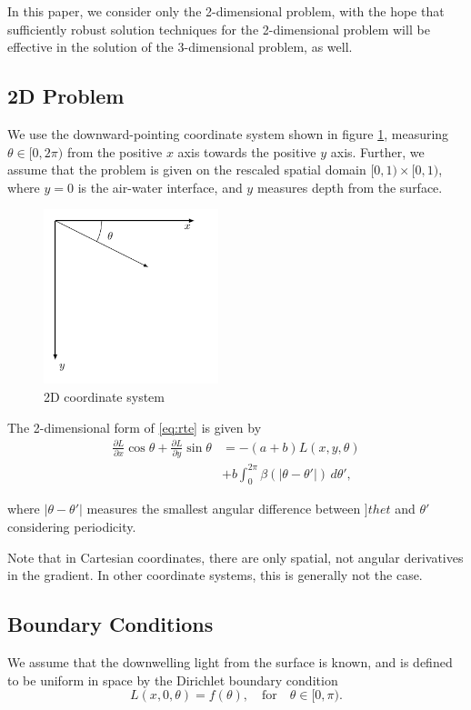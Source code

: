 \documentclass[10pt]{article}
\newcommand\abs[1]{\left| #1 \right|}
\newcommand\pd[2]{\frac{\partial #1}{\partial #2}}
\begin{document}
\begin{multicols}{2}
In this paper, we consider only the 2-dimensional problem, with the hope that sufficiently robust solution techniques for the 2-dimensional problem will be effective in the solution of the 3-dimensional problem, as well.

\subsection{2D Problem}
\label{sec:2d}
We use the downward-pointing coordinate system shown in figure \ref{fig:coords}, measuring $\theta \in [0,2\pi)$ from the positive $x$ axis towards the positive $y$ axis.
Further, we assume that the problem is given on the rescaled spatial domain $[0,1) \times [0,1)$, where $y=0$ is the air-water interface, and $y$ measures depth from the surface.

\begin{figure}[H]
	\centering
	\includegraphics[width=2in]{2d_coords}
	\caption{2D coordinate system}
	\label{fig:coords}
\end{figure}

The 2-dimensional form of \eqref{eq:rte} is given by
\begin{equation}
	\begin{aligned}
		\pd{L}{x} \cos\theta + \pd{L}{y} \sin\theta
		&= -(a+b)L(x,y,\theta) \\
		&+ b\int_0^{2\pi} \beta(\abs{\theta-\theta'})\,d\theta',
	\end{aligned}
	\label{eq:rte2d}
\end{equation}

where $\abs{\theta-\theta'}$ measures the smallest angular difference between $]thet$ and $\theta'$ considering periodicity.

Note that in Cartesian coordinates, there are only spatial, not angular derivatives in the gradient.
In other coordinate systems, this is generally not the case.
	
\subsection{Boundary Conditions}
We assume that the downwelling light from the surface is known, and is defined to be uniform in space by the Dirichlet boundary condition 
\begin{equation}
	L(x,0,\theta) = f(\theta), \quad \mbox{for} \quad \theta \in [0,\pi).
	\label{eq:surf_bc}
\end{equation}


\end{multicols}
\end{document}
